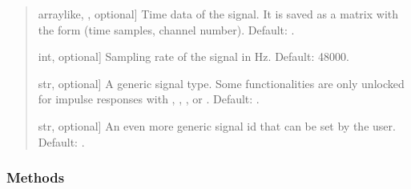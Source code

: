 \documentclass[letterpaper,10pt,english]{sphinxmanual}
\begin{document}
\begin{fulllineitems}
\begin{fulllineitems}
\begin{quote}
\begin{description}
\begin{description}
\sphinxlineitem{\sphinxstylestrong{time\_data}}{[}array\sphinxhyphen{}like, , optional{]}
\sphinxAtStartPar
Time data of the signal. It is saved as a matrix with the form
(time samples, channel number). Default: .

\sphinxlineitem{\sphinxstylestrong{sampling\_rate\_hz}}{[}int, optional{]}
\sphinxAtStartPar
Sampling rate of the signal in Hz. Default: 48000.

\sphinxlineitem{\sphinxstylestrong{signal\_type}}{[}str, optional{]}
\sphinxAtStartPar
A generic signal type. Some functionalities are only unlocked for
impulse responses with , , ,  or .
Default: .

\sphinxlineitem{\sphinxstylestrong{signal\_id}}{[}str, optional{]}
\sphinxAtStartPar
An even more generic signal id that can be set by the user.
Default: .

\end{description}

\end{description}\end{quote}
\subsubsection*{Methods}



\end{fulllineitems}
\end{fulllineitems}
\end{document}
